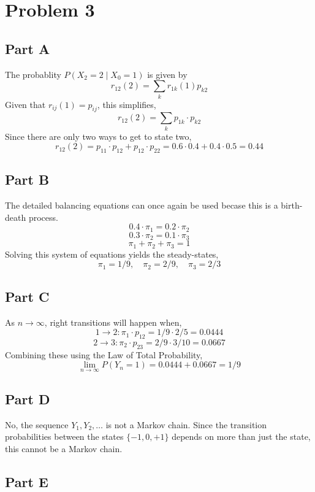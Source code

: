 \documentclass{article}
\begin{document}
\section*{Problem 3}

\subsection*{Part A}

The probablity $P(X_2 = 2 \mid X_0 = 1)$ is given by
$$ r_{12}(2) = \sum_k r_{1k}(1) p_{k2} $$
Given that $r_{ij}(1) = p_{ij}$, this simplifies,
$$ r_{12}(2) = \sum_k p_{1k} \cdot p_{k2} $$
Since there are only two ways to get to state two,
$$ r_{12}(2) = p_{11} \cdot p_{12} + p_{12} \cdot p_{22} = 0.6 \cdot 0.4 +
0.4 \cdot 0.5 = 0.44 $$

\subsection*{Part B}

The detailed balancing equations can once again be used becase this is a
birth-death process.
$$ 0.4 \cdot \pi_1 = 0.2 \cdot \pi_2 $$
$$ 0.3 \cdot \pi_2 = 0.1 \cdot \pi_3 $$
$$ \pi_1 + \pi_2 + \pi_3 = 1 $$
Solving this system of equations yields the steady-states,
$$ \pi_1 = 1/9,\quad \pi_2 = 2/9,\quad \pi_3 = 2/3 $$

\subsection*{Part C}

As $n \longrightarrow \infty$, right transitions will happen when,
$$ 1 \rightarrow 2: \pi_1 \cdot p_{12} = 1/9 \cdot 2/5 = 0.0444 $$
$$ 2 \rightarrow 3: \pi_2 \cdot p_{23} = 2/9 \cdot 3/10 = 0.0667 $$
Combining these using the Law of Total Probability,
$$ \lim_{n\rightarrow\infty} P(Y_n = 1) = 0.0444 + 0.0667 = 1/9 $$

\subsection*{Part D}

No, the sequence $Y_1, Y_2, \ldots$ is not a Markov chain. Since the
transition probabilities between the states $\{-1, 0, +1\}$ depends on more
than just the state, this cannot be a Markov chain.

\subsection*{Part E}
\end{document}
